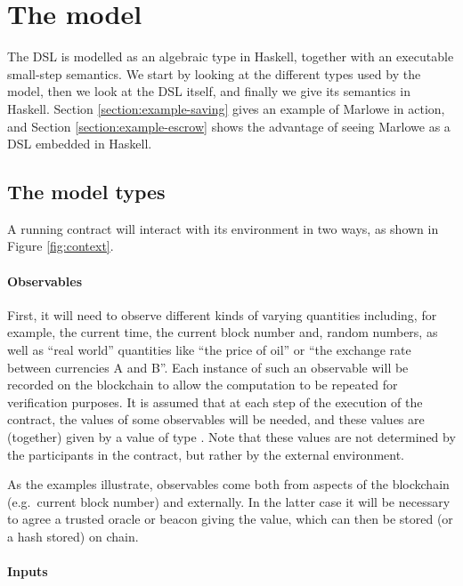 \documentclass[runningheads]{llncs}
\begin{document}
\section{The model}
\label{section:model}

The DSL is modelled as an algebraic type in Haskell, together with an executable small-step semantics. 
We start by looking at the different types used by the model, then we look at the  DSL itself, 
and finally we give its semantics in Haskell. Section \ref{section:example-saving} gives an example of Marlowe in 
action, and Section
\ref{section:example-escrow} shows the advantage of seeing Marlowe as a DSL embedded in Haskell.

\subsection{The model types}

A running contract will interact with its environment in two ways, as shown in Figure \ref{fig:context}.

\paragraph{Observables}


First, it will need to observe different kinds of varying quantities including, for example, the current time, the 
current block number and, random numbers, as well as ``real world'' quantities like ``the price of oil'' or ``the 
exchange rate between currencies A and B''. Each instance of such an observable will be recorded on the blockchain to 
allow the computation to be repeated for verification purposes. It is assumed that at each step of the execution of the 
contract, the values of some observables will be needed, and these values are (together) given by a value of type 
. Note that these values are not determined by the participants in the contract, but rather by the 
external environment.

As the examples illustrate, observables come both from aspects of the blockchain (e.g.\ current block number) and 
externally. In the latter case it will be necessary to agree a trusted oracle or beacon giving the value, which can then 
be stored (or a hash stored) on chain.

\paragraph{Inputs}
\end{document}
